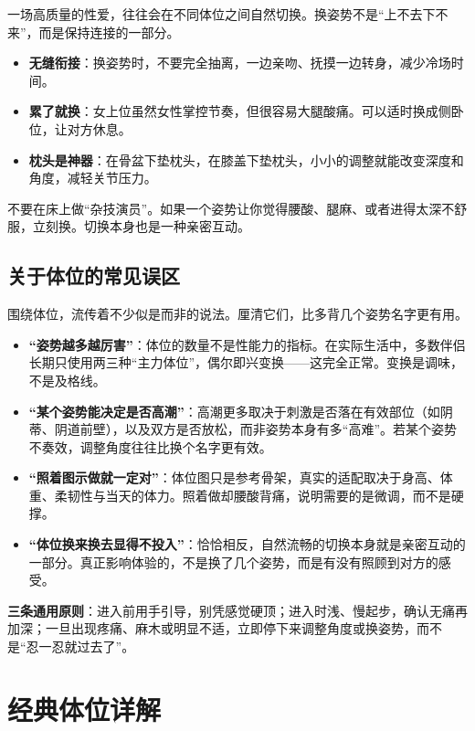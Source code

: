 \documentclass[12pt,UTF8]{ctexbook}
\begin{document}
一场高质量的性爱，往往会在不同体位之间自然切换。换姿势不是“上不去下不来”，而是保持连接的一部分。
\begin{itemize}
\item \textbf{无缝衔接}：换姿势时，不要完全抽离，一边亲吻、抚摸一边转身，减少冷场时间。
\item \textbf{累了就换}：女上位虽然女性掌控节奏，但很容易大腿酸痛。可以适时换成侧卧位，让对方休息。
\item \textbf{枕头是神器}：在骨盆下垫枕头，在膝盖下垫枕头，小小的调整就能改变深度和角度，减轻关节压力。
\end{itemize}

\begin{tcolorbox}[colback=pink!5!white,colframe=red!50!black,title=贴心小叮咛]
不要在床上做“杂技演员”。如果一个姿势让你觉得腰酸、腿麻、或者进得太深不舒服，立刻换。切换本身也是一种亲密互动。
\end{tcolorbox}

\section{关于体位的常见误区}

围绕体位，流传着不少似是而非的说法。厘清它们，比多背几个姿势名字更有用。

\begin{itemize}
\item \textbf{“姿势越多越厉害”}：体位的数量不是性能力的指标。在实际生活中，多数伴侣长期只使用两三种“主力体位”，偶尔即兴变换——这完全正常。变换是调味，不是及格线。
\item \textbf{“某个姿势能决定是否高潮”}：高潮更多取决于刺激是否落在有效部位（如阴蒂、阴道前壁），以及双方是否放松，而非姿势本身有多“高难”。若某个姿势不奏效，调整角度往往比换个名字更有效。
\item \textbf{“照着图示做就一定对”}：体位图只是参考骨架，真实的适配取决于身高、体重、柔韧性与当天的体力。照着做却腰酸背痛，说明需要的是微调，而不是硬撑。
\item \textbf{“体位换来换去显得不投入”}：恰恰相反，自然流畅的切换本身就是亲密互动的一部分。真正影响体验的，不是换了几个姿势，而是有没有照顾到对方的感受。
\end{itemize}

\textbf{三条通用原则}：进入前用手引导，别凭感觉硬顶；进入时浅、慢起步，确认无痛再加深；一旦出现疼痛、麻木或明显不适，立即停下来调整角度或换姿势，而不是“忍一忍就过去了”。

\chapter{经典体位详解}
\end{document}
